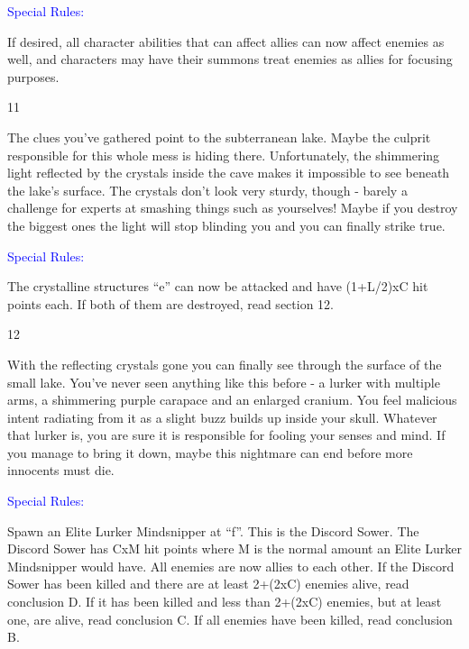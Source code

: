 \documentclass[fontsize=11pt]{scrartcl}
\begin{document}
\begin{multicols}{3}
		\begin{center}
	    {\myfont\normalsize{\textcolor{Blue}{Special Rules:}}}
		\end{center}
		\footnotesize{If desired, all character abilities that can affect allies can now affect enemies as well, and characters may have their summons treat enemies as allies for focusing purposes.}
		\begin{center}
		  {\myfont\large{\textcolor{Sepia}{11}}}
		\end{center}
		\footnotesize{The clues you’ve gathered point to the subterranean lake. Maybe the culprit responsible for this whole mess is hiding there. Unfortunately, the shimmering light reflected by the crystals inside the cave makes it impossible to see beneath the lake’s surface. The crystals don’t look very sturdy, though - barely a challenge for experts at smashing things such as yourselves! Maybe if you destroy the biggest ones the light will stop blinding you and you can finally strike true.}
		\begin{center}
	    {\myfont\normalsize{\textcolor{Blue}{Special Rules:}}}
		\end{center}
		\footnotesize{The crystalline structures “e” can now be attacked and have (1+L/2)xC hit points each. If both of them are destroyed, read section 12.}
		\begin{center}
		  {\myfont\large{\textcolor{Sepia}{12}}}
		\end{center}
		\footnotesize{With the reflecting crystals gone you can finally see through the surface of the small lake. You’ve never seen anything like this before - a lurker with multiple arms, a shimmering purple carapace and an enlarged cranium. You feel malicious intent radiating from it as a slight buzz builds up inside your skull. Whatever that lurker is, you are sure it is responsible for fooling your senses and mind. If you manage to bring it down, maybe this nightmare can end before more innocents must die.}
		\begin{center}
	    {\myfont\normalsize{\textcolor{Blue}{Special Rules:}}}
		\end{center}
		\footnotesize{Spawn an Elite Lurker Mindsnipper at “f”. This is the Discord Sower. The Discord Sower has CxM hit points where M is the normal amount an Elite Lurker Mindsnipper would have. All enemies are now allies to each other. If the Discord Sower has been killed and there are at least 2+(2xC) enemies alive, read conclusion D. If it has been killed and less than 2+(2xC) enemies, but at least one, are alive, read conclusion C. If all enemies have been killed, read conclusion B. }
		\end{multicols}
\end{document}
